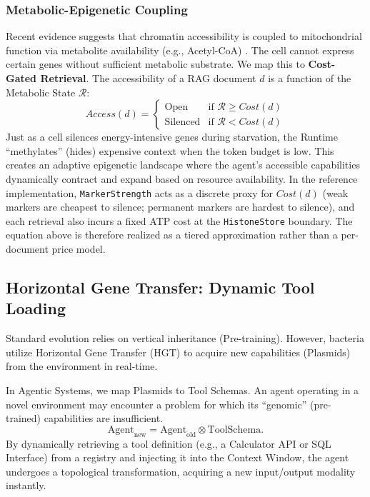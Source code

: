 \subsubsection{Metabolic-Epigenetic Coupling}

Recent evidence suggests that chromatin accessibility is coupled to mitochondrial function via metabolite
availability (e.g., Acetyl-CoA) \cite{chandel2024mitochondria}. The cell cannot express certain genes without
sufficient metabolic substrate. We map this to \textbf{Cost-Gated Retrieval}. The accessibility of a RAG
document $d$ is a function of the Metabolic State $\mathcal{R}$:
\begin{equation}
Access(d) =
\begin{cases}
  \text{Open} & \text{if } \mathcal{R} \ge Cost(d) \\
  \text{Silenced} & \text{if } \mathcal{R} < Cost(d)
\end{cases}
\label{eq:cost-gated-retrieval}
\end{equation}
Just as a cell silences energy-intensive genes during starvation, the Runtime ``methylates'' (hides) expensive
context when the token budget is low. This creates an adaptive epigenetic landscape where the agent's accessible
capabilities dynamically contract and expand based on resource availability. In the reference implementation,
\texttt{MarkerStrength} acts as a discrete proxy for $Cost(d)$ (weak markers are cheapest to silence; permanent
markers are hardest to silence), and each retrieval also incurs a fixed ATP cost at the \texttt{HistoneStore}
boundary. The equation above is therefore realized as a tiered approximation rather than a per-document price model.

\subsection{Horizontal Gene Transfer: Dynamic Tool Loading}
\label{sec:hgt}

Standard evolution relies on vertical inheritance (Pre-training). However, bacteria utilize Horizontal Gene
Transfer (HGT) to acquire new capabilities (Plasmids) from the environment in real-time.

In Agentic Systems, we map Plasmids to Tool Schemas. An agent operating in a novel environment may encounter a
problem for which its ``genomic'' (pre-trained) capabilities are insufficient.
\begin{equation}
\mathrm{Agent}_{\text{new}} = \mathrm{Agent}_{\text{old}} \otimes \mathrm{ToolSchema}.
\label{eq:horizontal-gene-transfer}
\end{equation}
By dynamically retrieving a tool definition (e.g., a Calculator API or SQL Interface) from a registry and
injecting it into the Context Window, the agent undergoes a topological transformation, acquiring a new
input/output modality instantly.

